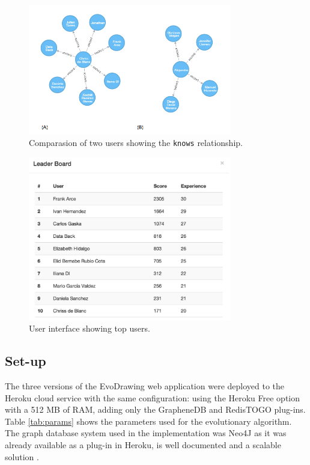 \documentclass[conference]{IEEEtran}
\begin{document}
\begin{figure}[!t]
    \centering
        \includegraphics[width=3.5in]{img/users_known_1.png}
    \caption{Comparasion of two users showing the {\tt knows} relationship.}
    \label{fig:users-graph}
\end{figure}



\begin{figure}[!t]
    \centering
        \includegraphics[width=3.5in]{img/leaderBoard.png}
    \caption{User interface showing top users.}
    \label{fig:top-users}
\end{figure}



\subsection{Set-up}
\label{sec:setup}

The three versions of the EvoDrawing web application were deployed to the
Heroku cloud service with the same configuration: using the
Heroku Free option with a 512 MB of RAM, adding only the GrapheneDB and RedisTOGO plug-ins.
Table \ref{tab:params} shows the parameters used for the evolutionary algorithm. The graph database 
system used in the implementation was Neo4J as it was already available as a plug-in in Heroku, is well documented
and a scalable solution \cite{miller2013graph,holzschuher2013performance}.  
\end{document}
